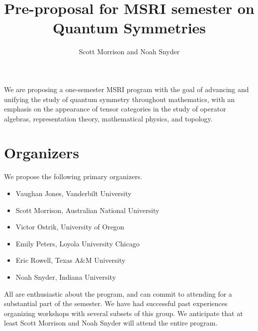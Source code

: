 \documentclass[12pt]{article}
\title{Pre-proposal for MSRI semester on \textbf{Quantum Symmetries}}
\author{Scott Morrison and Noah Snyder}
\begin{document}
\maketitle






We are proposing a one-semester MSRI program with the goal of advancing and unifying the study of quantum symmetry throughout mathematics, with an emphasis on the appearance of tensor categories in the study of operator algebras, representation theory, mathematical physics, and topology.

\section{Organizers}
We propose the following primary organizers.
\begin{itemize}
  \setlength{\itemsep}{1pt}
  \setlength{\parskip}{0pt}
  \setlength{\parsep}{0pt}
\item Vaughan Jones, Vanderbilt University
\item Scott Morrison, Australian National University
\item Victor Ostrik, University of Oregon
\item Emily Peters, Loyola University Chicago
\item Eric Rowell, Texas A\&M University
\item Noah Snyder, Indiana University
\end{itemize}
All are enthusiastic about the program, and can commit to attending for a substantial part of the semester. We have had successful past experiences organizing workshops with several subsets of this group.  We anticipate that at least Scott Morrison and Noah Snyder will attend the entire program.
\end{document}
